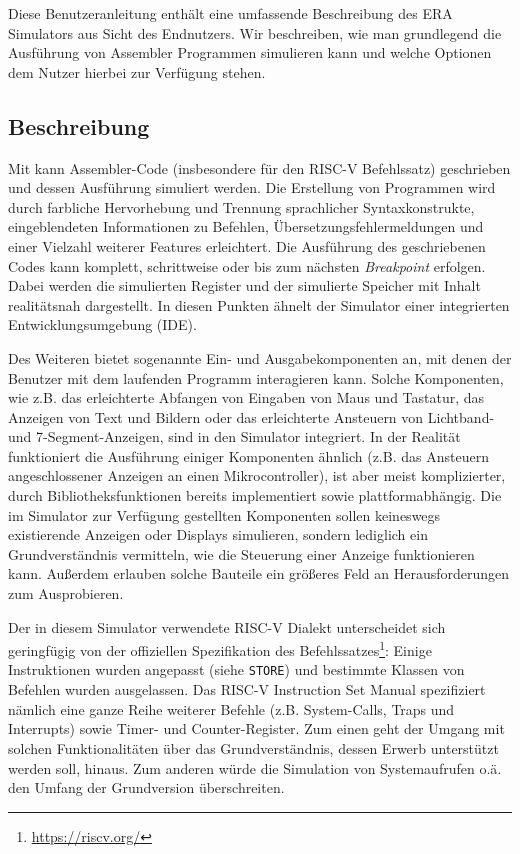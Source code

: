 

Diese Benutzeranleitung enthält eine umfassende Beschreibung des ERA Simulators
aus Sicht des Endnutzers. Wir beschreiben, wie man grundlegend die Ausführung
von Assembler Programmen simulieren kann und welche Optionen dem Nutzer hierbei
zur Verfügung stehen.

\subsection{Beschreibung}

Mit \erasim{} kann Assembler-Code (insbesondere für den RISC-V Befehlssatz)
geschrieben und dessen Ausführung simuliert werden. Die Erstellung von
Programmen wird durch farbliche Hervorhebung und Trennung sprachlicher
Syntaxkonstrukte, eingeblendeten Informationen zu Befehlen,
Übersetzungsfehlermeldungen und einer Vielzahl weiterer Features erleichtert.
Die Ausführung des geschriebenen Codes kann komplett, schrittweise oder bis zum
nächsten \emph{Breakpoint} erfolgen. Dabei werden die simulierten Register und
der simulierte Speicher mit Inhalt realitätsnah dargestellt. In diesen Punkten
ähnelt der Simulator einer integrierten Entwicklungsumgebung (IDE).

Des Weiteren bietet \erasim{} sogenannte Ein- und Ausgabekomponenten an, mit
denen der Benutzer mit dem laufenden Programm interagieren kann. Solche
Komponenten, wie z.B. das erleichterte Abfangen von Eingaben von Maus und
Tastatur, das Anzeigen von Text und Bildern oder das erleichterte Ansteuern von
Lichtband- und 7-Segment-Anzeigen, sind in den Simulator integriert. In der
Realität funktioniert die Ausführung einiger Komponenten ähnlich (z.B. das
Ansteuern angeschlossener Anzeigen an einen Mikrocontroller), ist aber meist
komplizierter, durch Bibliotheksfunktionen bereits implementiert sowie
plattformabhängig. Die im Simulator zur Verfügung gestellten Komponenten sollen
keineswegs existierende Anzeigen oder Displays simulieren, sondern lediglich ein
Grundverständnis vermitteln, wie die Steuerung einer Anzeige funktionieren kann.
Außerdem erlauben solche Bauteile ein größeres Feld an Herausforderungen zum
Ausprobieren.

Der in diesem Simulator verwendete RISC-V Dialekt unterscheidet sich geringfügig
von der offiziellen Spezifikation des
Befehlssatzes\footnote{\url{https://riscv.org/}}: Einige Instruktionen wurden
angepasst (siehe \texttt{STORE}) und bestimmte Klassen von Befehlen wurden
ausgelassen. Das RISC-V Instruction Set Manual spezifiziert nämlich eine ganze
Reihe weiterer Befehle (z.B. System-Calls, Traps und Interrupts) sowie Timer-
und Counter-Register. Zum einen geht der Umgang mit solchen Funktionalitäten
über das Grundverständnis, dessen Erwerb unterstützt werden soll, hinaus. Zum
anderen würde die Simulation von Systemaufrufen o.ä. den Umfang der Grundversion
überschreiten.

